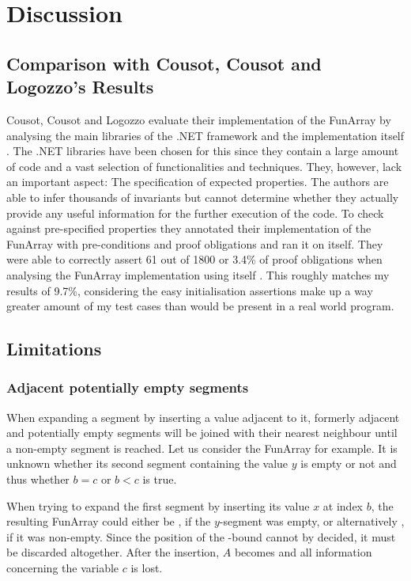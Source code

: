 \section{Discussion}
\subsection{Comparison with Cousot, Cousot and Logozzo's Results}

Cousot, Cousot and Logozzo evaluate their implementation of the FunArray by analysing the main libraries of the .NET framework and the implementation itself \cite{cousot2011}. The .NET libraries have been chosen for this since they contain a large amount of code and a vast selection of functionalities and techniques. They, however, lack an important aspect: The specification of expected properties. The authors are able to infer thousands of invariants but cannot determine whether they actually provide any useful information for the further execution of the code. To check against pre-specified properties they annotated their implementation of the FunArray with pre-conditions and proof obligations and ran it on itself. They were able to correctly assert 61 out of 1800 or 3.4\% of proof obligations when analysing the FunArray implementation using itself \cite{cousot2011}. This roughly matches my results of 9.7\%, considering the easy initialisation assertions make up a way greater amount of my test cases than would be present in a real world program.

\subsection{Limitations}

\subsubsection{Adjacent potentially empty segments}
When expanding a segment by inserting a value adjacent to it, formerly adjacent and potentially empty segments will be joined with their nearest neighbour until a non-empty segment is reached. Let us consider the FunArray  for example. It is unknown whether its second segment containing the value $y$ is empty or not and thus whether $b=c$ or $b<c$ is true.

When trying to expand the first segment by inserting its value $x$ at index $b$, the resulting FunArray could either be , if the $y$-segment was empty, or alternatively , if it was non-empty. Since the position of the -bound cannot by decided, it must be discarded altogether. After the insertion, $A$ becomes  and all information concerning the variable $c$ is lost.

